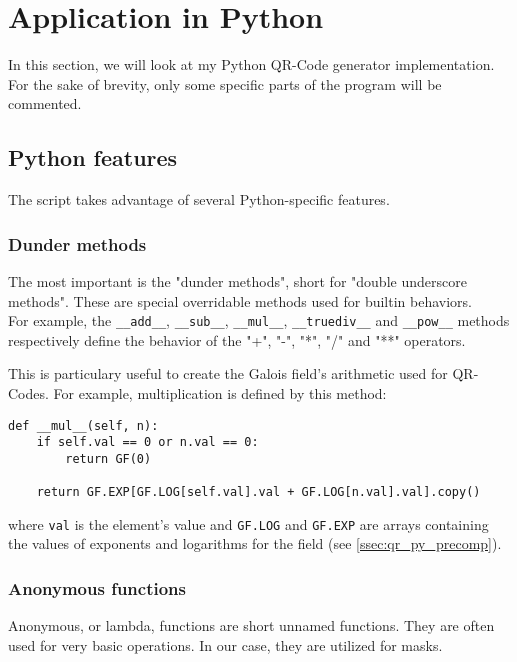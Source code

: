 \section{Application in Python}
\label{sec:qr_python}

In this section, we will look at my Python QR-Code generator implementation.
For the sake of brevity, only some specific parts of the program will be commented.

\subsection{Python features}
\label{ssec:qr_py_features}

The script takes advantage of several Python-specific features.

\subsubsection{Dunder methods}
\label{sssec:qr_py_dunder}

The most important is the "dunder methods", short for "double underscore methods".
These are special overridable methods used for builtin behaviors.\\
For example, the \texttt{\_\_add\_\_}, \texttt{\_\_sub\_\_}, \texttt{\_\_mul\_\_}, \texttt{\_\_truediv\_\_} and \texttt{\_\_pow\_\_} methods respectively
define the behavior of the "+", "-", "*", "/" and "**" operators.

This is particulary useful to create the Galois field's arithmetic used for QR-Codes.
For example, multiplication is defined by this method:

\begin{verbatim}
def __mul__(self, n):
    if self.val == 0 or n.val == 0:
        return GF(0)

    return GF.EXP[GF.LOG[self.val].val + GF.LOG[n.val].val].copy()
\end{verbatim}

where \texttt{val} is the element's value and \texttt{GF.LOG} and \texttt{GF.EXP} are arrays containing the values of exponents and logarithms for the field (see \autoref{ssec:qr_py_precomp}).

\subsubsection{Anonymous functions}
\label{sssec:qr_py_lambda}

Anonymous, or lambda, functions are short unnamed functions. They are often used for very basic operations. In our case, they are utilized for masks.

